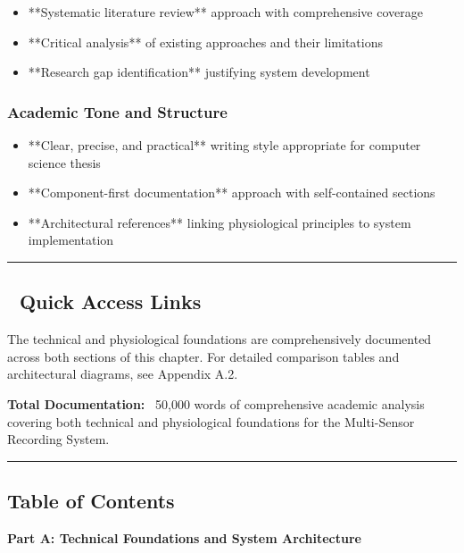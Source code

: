 \documentclass[12pt,a4paper]{article}
\begin{document}
\begin{itemize}
\item **Systematic literature review** approach with comprehensive coverage
\item **Critical analysis** of existing approaches and their limitations
\item **Research gap identification** justifying system development

\end{itemize}
\subsubsection{Academic Tone and Structure}

\begin{itemize}
\item **Clear, precise, and practical** writing style appropriate for computer science thesis
\item **Component-first documentation** approach with self-contained sections
\item **Architectural references** linking physiological principles to system implementation

\end{itemize}
\hrule

\subsection{🚀 Quick Access Links}

The technical and physiological foundations are comprehensively documented across both sections of this chapter. For
detailed comparison tables and architectural diagrams, see Appendix A.2.

\textbf{Total Documentation:} ~50,000 words of comprehensive academic analysis covering both technical and physiological
foundations for the Multi-Sensor Recording System.

\hrule

\subsection{Table of Contents}

\textbf{Part A: Technical Foundations and System Architecture}
\end{document}
